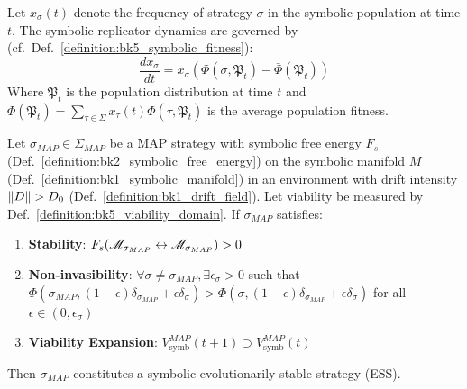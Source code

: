\begin{definition} \label{definition:bk5_symbolic_replicator_dynamics}

Let $x_\sigma(t)$ denote the frequency of strategy $\sigma$ in the symbolic population at time $t$. The symbolic replicator dynamics are governed by (cf.~Def.~\ref{definition:bk5_symbolic_fitness}):
\begin{equation}
\frac{dx_\sigma}{dt} = x_\sigma \left( \Phi(\sigma, \mathfrak{P}_t) - \bar{\Phi}(\mathfrak{P}_t) \right)
\end{equation}
Where $\mathfrak{P}_t$ is the population distribution at time $t$ and $\bar{\Phi}(\mathfrak{P}_t) = \sum_{\tau \in \Sigma} x_\tau(t) \Phi(\tau, \mathfrak{P}_t)$ is the average population fitness.
\end{definition}
\begin{proposition}
\label{proposition:bk5_symbolic_ess_via_map_observability_variant}
Let $\sigma_{MAP} \in \Sigma_{MAP}$ be a MAP strategy with symbolic free energy $F_s$ (Def.~\ref{definition:bk2_symbolic_free_energy}) on the symbolic manifold $M$ (Def.~\ref{definition:bk1_symbolic_manifold}) in an environment with drift intensity $\|D\| > D_0$ (Def.~\ref{definition:bk1_drift_field}). Let viability be measured by Def.~\ref{definition:bk5_viability_domain}. If $\sigma_{MAP}$ satisfies:
\begin{enumerate}
    \item \textbf{Stability}: $F_s(\mathscr{M}_{\sigma_{MAP}} \leftrightarrow \mathscr{M}_{\sigma_{MAP}}) > 0$
    \item \textbf{Non-invasibility}: $\forall \sigma \neq \sigma_{MAP}, \exists \epsilon_\sigma > 0$ such that 
    $\Phi(\sigma_{MAP}, (1-\epsilon)\delta_{\sigma_{MAP}} + \epsilon\delta_\sigma) > \Phi(\sigma, (1-\epsilon)\delta_{\sigma_{MAP}} + \epsilon\delta_\sigma)$ for all $\epsilon \in (0, \epsilon_\sigma)$
    \item \textbf{Viability Expansion}: $V_{\text{symb}}^{MAP}(t+1) \supset V_{\text{symb}}^{MAP}(t)$
\end{enumerate}
Then $\sigma_{MAP}$ constitutes a symbolic evolutionarily stable strategy (ESS).
\end{proposition}
